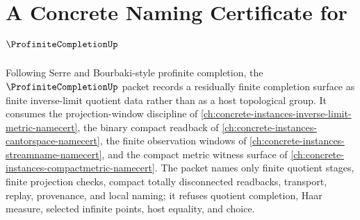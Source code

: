 \chapter{A Concrete Naming Certificate for $\ProfiniteCompletionUp$}
\label{ch:concrete-instances-profinite-completion-namecert}

Following Serre and Bourbaki-style profinite completion, the $\ProfiniteCompletionUp$ packet records a residually finite completion surface as finite inverse-limit quotient data rather than as a host topological group. It consumes the projection-window discipline of \autoref{ch:concrete-instances-inverse-limit-metric-namecert}, the binary compact readback of \autoref{ch:concrete-instances-cantorspace-namecert}, the finite observation windows of \autoref{ch:concrete-instances-streamname-namecert}, and the compact metric witness surface of \autoref{ch:concrete-instances-compactmetric-namecert}. The packet names only finite quotient stages, finite projection checks, compact totally disconnected readbacks, transport, replay, provenance, and local naming; it refuses quotient completion, Haar measure, selected infinite points, host equality, and choice.

